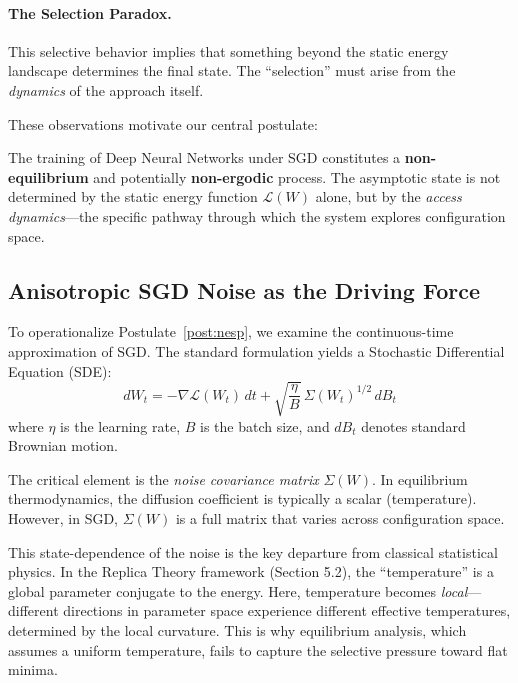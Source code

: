 \documentclass[
  journal=largetwo,
  simfonts=false,
  year=2025,
  volume=37,
]{cup-journal}
\begin{document}
\paragraph{The Selection Paradox.} This selective behavior implies that something beyond the static energy landscape determines the final state. The ``selection'' must arise from the \textit{dynamics} of the approach itself.

These observations motivate our central postulate:

\begin{postulate}\label{post:nesp}
The training of Deep Neural Networks under SGD constitutes a \textbf{non-equilibrium} and potentially \textbf{non-ergodic} process. The asymptotic state is not determined by the static energy function $\mathcal{L}(W)$ alone, but by the \textit{access dynamics}---the specific pathway through which the system explores configuration space.
\end{postulate}

\subsection{Anisotropic SGD Noise as the Driving Force}

To operationalize Postulate~\ref{post:nesp}, we examine the continuous-time approximation of SGD. The standard formulation yields a Stochastic Differential Equation (SDE):
\begin{equation}\label{eq:langevin_sgd}
    dW_t = -\nabla \mathcal{L}(W_t) \, dt + \sqrt{\frac{\eta}{B}} \, \Sigma(W_t)^{1/2} \, dB_t
\end{equation}
where $\eta$ is the learning rate, $B$ is the batch size, and $dB_t$ denotes standard Brownian motion.

The critical element is the \textit{noise covariance matrix} $\Sigma(W)$. In equilibrium thermodynamics, the diffusion coefficient is typically a scalar (temperature). However, in SGD, $\Sigma(W)$ is a full matrix that varies across configuration space.

This state-dependence of the noise is the key departure from classical statistical physics. In the Replica Theory framework (Section 5.2), the ``temperature'' is a global parameter conjugate to the energy. Here, temperature becomes \textit{local}---different directions in parameter space experience different effective temperatures, determined by the local curvature. This is why equilibrium analysis, which assumes a uniform temperature, fails to capture the selective pressure toward flat minima.
\end{document}
